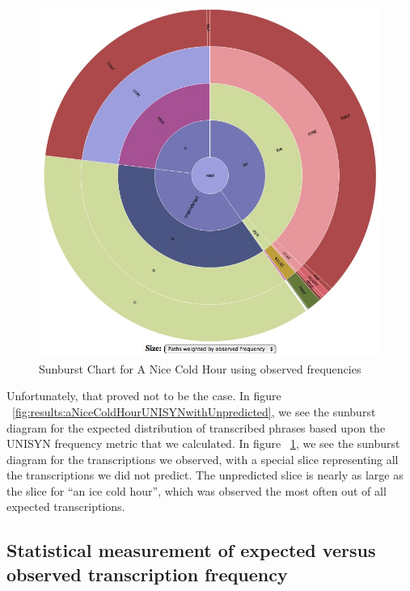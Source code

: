 \begin{figure}
\includegraphics[width=150mm]{aNiceColdHour_Observed.jpg}
\captionfonts
\caption[Sunburst Chart for A Nice Cold Hour using observed frequencies]{Sunburst Chart for A Nice Cold Hour using observed frequencies}
\label{fig:results:aNiceColdHourObserved}
\end{figure}


Unfortunately, that proved not to be the case.  In figure ~\ref{fig:results:aNiceColdHourUNISYNwithUnpredicted}, we see the sunburst diagram for the expected distribution of transcribed phrases based upon the UNISYN frequency metric that we calculated.  In figure ~\ref{fig:results:aNiceColdHourObserved}, we see the sunburst diagram for the transcriptions we observed, with a special slice representing all the transcriptions we did not predict. The unpredicted slice is nearly as large as the slice for ``an ice cold hour'', which was observed the most often out of all expected transcriptions. 


\subsection{Statistical measurement of expected versus observed transcription frequency}
\label{results:statisticsINYOURFACE}


